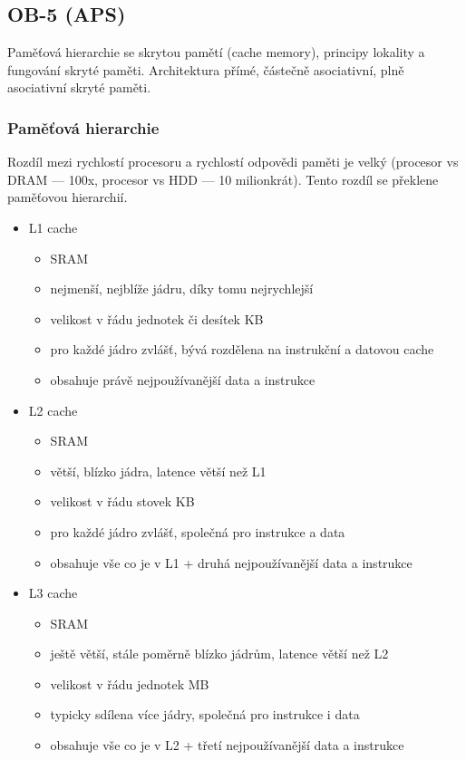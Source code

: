 \subsection{OB-5 (APS)}
Paměťová hierarchie se skrytou pamětí (cache memory), principy lokality a fungování skryté paměti. Architektura přímé, částečně asociativní, plně asociativní skryté paměti.

\subsubsection*{Paměťová hierarchie}

Rozdíl mezi rychlostí procesoru a rychlostí odpovědi paměti je velký (procesor vs DRAM --- 100x, procesor vs HDD --- 10 milionkrát).
Tento rozdíl se překlene paměťovou hierarchií.

\begin{itemize}
	\item L1 cache
	\begin{itemize}
		\item SRAM
		\item nejmenší, nejblíže jádru, díky tomu nejrychlejší
		\item velikost v řádu jednotek či desítek KB
		\item pro každé jádro zvlášť, bývá rozdělena na instrukční a datovou cache
		\item obsahuje právě nejpoužívanější data a instrukce
	\end{itemize}
	
	\item L2 cache
	\begin{itemize}
		\item SRAM
		\item větší, blízko jádra, latence větší než L1
		\item velikost v řádu stovek KB
		\item pro každé jádro zvlášť, společná pro instrukce a data
		\item obsahuje vše co je v L1 + druhá nejpoužívanější data a instrukce
	\end{itemize}
	
	\item L3 cache
	\begin{itemize}
		\item SRAM
		\item ještě větší, stále poměrně blízko jádrům, latence větší než L2
		\item velikost v řádu jednotek MB
		\item typicky sdílena více jádry, společná pro instrukce i data
		\item obsahuje vše co je v L2 + třetí nejpoužívanější data a instrukce
	\end{itemize}
	

\end{itemize}
